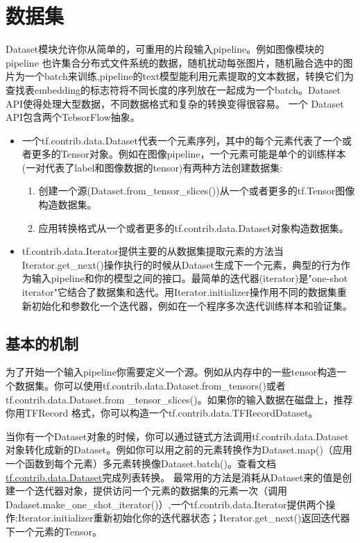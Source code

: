 \section{数据集}
Dataset模块允许你从简单的，可重用的片段输入pipeline。例如图像模块的pipeline
也许集合分布式文件系统的数据，随机扰动每张图片，随机融合选中的图片为一个batch来训练,pipeline的text模型能利用元素提取的文本数据，转换它们为查找表embedding的标志符将不同长度的序列放在一起成为一个batch。Dataset API使得处理大型数据，不同数据格式和复杂的转换变得很容易。
一个 Dataset
 API包含两个TebsorFlow抽象。
\begin{itemize}
\item 一个tf.contrib.data.Dataset代表一个元素序列，其中的每个元素代表了一个或者更多的Tensor对象。例如在图像pipeline，一个元素可能是单个的训练样本(一对代表了label和图像数据的tensor)有两种方法创建数据集:
	\begin{enumerate}
		\item 创建一个源(Dataset.from\_tensor\_slices())从一个或者更多的tf.Tensor图像构造数据集。
		\item 应用转换格式从一个或者更多的tf.contrib.data.Dataset对象构造数据集。
	\end{enumerate}
	\item tf.contrib.data.Iterator提供主要的从数据集提取元素的方法当Iterator.get\_next()操作执行的时候从Dataset生成下一个元素，典型的行为作为输入pipeline和你的模型之间的接口。最简单的迭代器(iterator)是"one-shot iterator"它结合了数据集和迭代。用Iterator.initializer操作用不同的数据集重新初始化和参数化一个迭代器，例如在一个程序多次迭代训练样本和验证集。
\end{itemize}
\subsection{基本的机制}
为了开始一个输入pipeline你需要定义一个源。例如从内存中的一些tensor构造一个数据集。你可以使用tf.contrib.data.Dataset.from\_tensors()或者tf.contrib.data.Dataset.from
\newline \_tensor\_slices()。如果你的输入数据在磁盘上，推荐你用TFRecord
格式，你可以构造一个tf.contrib.data.TFRecordDataset。

当你有一个Dataset对象的时候，你可以通过链式方法调用tf.contrib.data.Dataset对象转化成新的Dataset。例如你可以用之前的元素转换作为Dataset.map()（应用一个函数到每个元素）多元素转换像Dataset.batch()。查看文档\href{https://www.tensorflow.org/api_docs/python/tf/contrib/data/Dataset}{tf.contrib.data.Dataset}完成列表转换。
最常用的方法是消耗从Dataset来的值是创建一个迭代器对象，提供访问一个元素的数据集的元素一次（调用Dadaset.make\_one\_shot\_iterator()）,一个tf.contrib.data.Iterator提供两个操作:Iterator.initializer重新初始化你的迭代器状态；Iterator.get\_next()返回迭代器下一个元素的Tensor。
